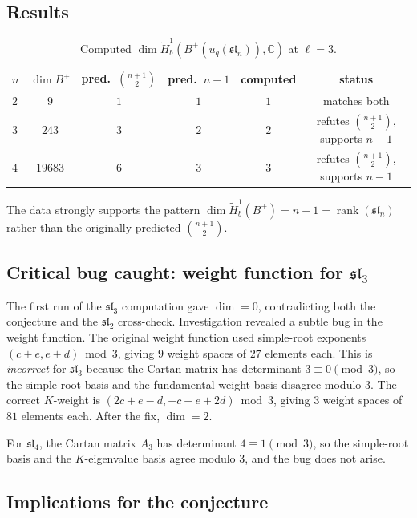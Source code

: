 \documentclass[11pt,letterpaper]{amsart}
\theoremstyle{plain}
\theoremstyle{definition}
\theoremstyle{remark}
\newcommand{\CC}{\mathbb{C}}
\begin{document}
\subsection{Results}

\begin{table}[htbp]
\centering
\caption{Computed $\dim \tilde{H}^1_b(B^+(u_q(\mathfrak{sl}_n)), \CC)$ at $\ell = 3$.}
\label{tab:h1b}
\begin{tabular}{@{}lccccc@{}}
\toprule
$n$ & $\dim B^+$ & pred.\ $\binom{n+1}{2}$ & pred.\ $n-1$ & computed & status \\
\midrule
$2$ & $9$ & $1$ & $1$ & $1$ & matches both \\
$3$ & $243$ & $3$ & $2$ & $2$ & refutes $\binom{n+1}{2}$, supports $n-1$ \\
$4$ & $19683$ & $6$ & $3$ & $3$ & refutes $\binom{n+1}{2}$, supports $n-1$ \\
\bottomrule
\end{tabular}
\end{table}

The data strongly supports the pattern $\dim \tilde{H}^1_b(B^+) = n - 1 = \operatorname{rank}(\mathfrak{sl}_n)$ rather than the originally predicted $\binom{n+1}{2}$.

\subsection{Critical bug caught: weight function for $\mathfrak{sl}_3$}

The first run of the $\mathfrak{sl}_3$ computation gave $\dim = 0$, contradicting both the conjecture and the $\mathfrak{sl}_2$ cross-check. Investigation revealed a subtle bug in the weight function. The original weight function used simple-root exponents $(c+e, e+d) \bmod 3$, giving $9$ weight spaces of $27$ elements each. This is \emph{incorrect} for $\mathfrak{sl}_3$ because the Cartan matrix has determinant $3 \equiv 0 \pmod{3}$, so the simple-root basis and the fundamental-weight basis disagree modulo $3$. The correct $K$-weight is $(2c+e-d, -c+e+2d) \bmod 3$, giving $3$ weight spaces of $81$ elements each. After the fix, $\dim = 2$.

For $\mathfrak{sl}_4$, the Cartan matrix $A_3$ has determinant $4 \equiv 1 \pmod{3}$, so the simple-root basis and the $K$-eigenvalue basis agree modulo $3$, and the bug does not arise.

\subsection{Implications for the conjecture}
\end{document}
